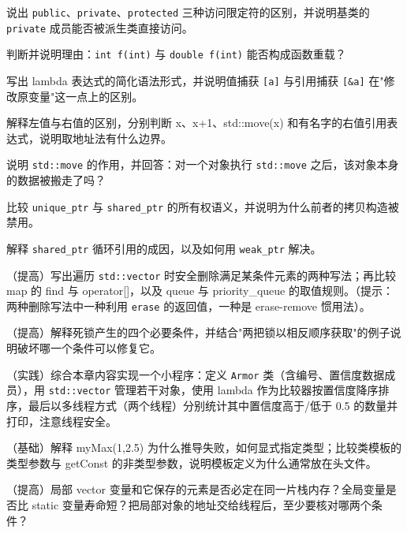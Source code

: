 \documentclass[
  lang=cn,
  scheme=chinese,
  chinesefont=ctexfont,
  11pt,
  oneside,
  device=normal,
  color=cyan,
  mode=fancy
]{../templates/elegantbook}
\begin{document}
\begin{problemset}
\item \label{prob:v1-cpp-1} 说出 \texttt{public}、\texttt{private}、\texttt{protected} 三种访问限定符的区别，并说明基类的 \texttt{private} 成员能否被派生类直接访问。
\item \label{prob:v1-cpp-2} 判断并说明理由：\texttt{int f(int)} 与 \texttt{double f(int)} 能否构成函数重载？
\item \label{prob:v1-cpp-3} 写出 lambda 表达式的简化语法形式，并说明值捕获 \texttt{[a]} 与引用捕获 \texttt{[\&a]} 在"修改原变量"这一点上的区别。
\item \label{prob:v1-cpp-4} 解释左值与右值的区别，分别判断 x、x+1、std::move(x) 和有名字的右值引用表达式，说明取地址法有什么边界。
\item \label{prob:v1-cpp-5} 说明 \texttt{std::move} 的作用，并回答：对一个对象执行 \texttt{std::move} 之后，该对象本身的数据被搬走了吗？
\item \label{prob:v1-cpp-6} 比较 \texttt{unique\_ptr} 与 \texttt{shared\_ptr} 的所有权语义，并说明为什么前者的拷贝构造被禁用。
\item \label{prob:v1-cpp-7} 解释 \texttt{shared\_ptr} 循环引用的成因，以及如何用 \texttt{weak\_ptr} 解决。
\item \label{prob:v1-cpp-8} （提高）写出遍历 \texttt{std::vector} 时安全删除满足某条件元素的两种写法；再比较 map 的 find 与 operator[]，以及 queue 与 priority\_queue 的取值规则。（提示：两种删除写法中一种利用 \texttt{erase} 的返回值，一种是 erase-remove 惯用法）。
\item \label{prob:v1-cpp-9} （提高）解释死锁产生的四个必要条件，并结合"两把锁以相反顺序获取"的例子说明破坏哪一个条件可以修复它。
\item \label{prob:v1-cpp-10} （实践）综合本章内容实现一个小程序：定义 \texttt{Armor} 类（含编号、置信度数据成员），用 \texttt{std::vector} 管理若干对象，使用 lambda 作为比较器按置信度降序排序，最后以多线程方式（两个线程）分别统计其中置信度高于/低于 0.5 的数量并打印，注意线程安全。

\item \label{prob:v1-cpp-11}（基础）解释 myMax(1,2.5) 为什么推导失败，如何显式指定类型；比较类模板的类型参数与 getConst 的非类型参数，说明模板定义为什么通常放在头文件。
\item \label{prob:v1-cpp-12}（提高）局部 vector 变量和它保存的元素是否必定在同一片栈内存？全局变量是否比 static 变量寿命短？把局部对象的地址交给线程后，至少要核对哪两个条件？
\end{problemset}
\end{document}
